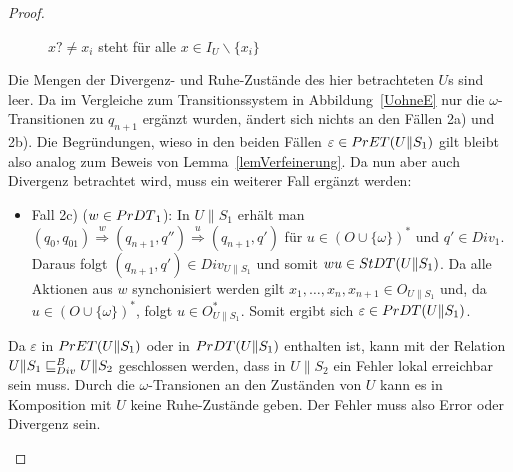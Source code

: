\begin{proof}
\begin{itemize}
\begin{figure} [h!tbp]
\begin{center}
        \caption{$x?\neq x_i$ steht für alle $x\in I_U\backslash\{x_i\}$}
\label{UohneEmitO}
      \end{center}
      \end{figure}
      Die Mengen der Divergenz- und Ruhe-Zustände des hier betrachteten $U$s
      sind leer. Da im Vergleiche zum Transitionssystem in
      Abbildung~\ref{UohneE} nur die $\omega$-Transitionen zu $q_{n+1}$ ergänzt
      wurden, ändert sich nichts an den Fällen 2a) und 2b). Die Begründungen,
      wieso in den beiden Fällen $\varepsilon\in PrET{}(U\|S_1)$ gilt bleibt
      also analog zum Beweis von Lemma~\ref{lemVerfeinerung}. Da nun aber auch
      Divergenz betrachtet wird, muss ein weiterer Fall ergänzt werden:
      \begin{itemize}
        \item Fall 2c) ($w\in PrDT{}_1$): In $U\|S_1$ erhält man $(q_0,q_{01})
          \overset{w}{\Rightarrow} (q_{n+1},q'') \overset{u}{\Rightarrow}
          (q_{n+1},q')$ für $u\in (O\cup \{\omega\})^*$ und $q'\in Div_1$.
          Daraus folgt $(q_{n+1},q')\in Div_{U\|S_1}$ und somit $wu\in
          StDT{}(U\|S_1)$. Da alle Aktionen aus $w$ synchonisiert werden gilt
          $x_1,\dots ,x_n,x_{n+1}\in O_{U\|S_1}$ und, da $u\in (O\cup
          \{\omega\})^*$, folgt $u\in O_{U\|S_1}^*$. Somit ergibt sich
          $\varepsilon\in PrDT{}(U\|S_1)$.
      \end{itemize}
      Da $\varepsilon$ in $PrET{}(U\|S_1)$ oder in $PrDT{}(U\|S_1)$ enthalten
      ist, kann mit der Relation $U\|S_1\sqsubseteq _{Div}^B U\|S_2$ geschlossen werden, dass
      in $U\|S_2$ ein Fehler lokal erreichbar sein muss. Durch die
      $\omega$-Transionen an den Zuständen von $U$ kann es in Komposition mit
      $U$ keine Ruhe-Zustände geben. Der Fehler muss also Error oder Divergenz
      sein.
      \begin{itemize}

\end{itemize}
\end{itemize}
\end{proof}
